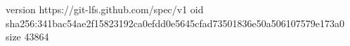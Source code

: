 version https://git-lfs.github.com/spec/v1
oid sha256:341bac54ae2f15823192ca0efdd0e5645cfad73501836e50a506107579e173a0
size 43864
